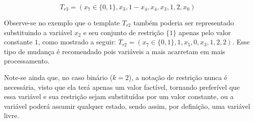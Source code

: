 \begin{equation}
T_{r3} = (x_7 \in \{0,1\}, x_3, 1-x_4, x_4, x_3, 1, 2, x_0)
\label{eq:templateIntescecao}
\end{equation}

Observe-se no exemplo que o template $T_{r2}$ também poderia ser representado substituindo a variável $x_2$ e seu conjunto de restrição $\{1\}$ apenas pelo valor constante $1$, como mostrado a seguir: $T_{r2} = (x_7 \in \{0,1\}, 1, x_5, 0, x_3, 1, 2, 2)$. Esse tipo de mudança é recomendado pois variáveis a mais acarretam em mais processamento.

Note-se ainda que, no caso binário ($k = 2$), a notação de restrição nunca é necessária, visto que ela terá apenas um valor factível, tornando preferível que essa variável e sua restrição sejam substituídas por um valor constante, ou a variável poderá assumir qualquer estado, sendo assim, por definição, uma variável livre.